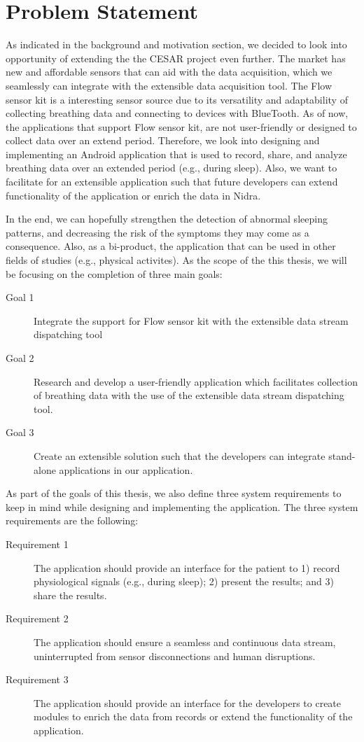 \section{Problem Statement}

As indicated in the background and motivation section, we decided to look into opportunity of extending the the CESAR project even further. The market has new and affordable sensors that can aid with the data acquisition, which we seamlessly can integrate with the extensible data acquisition tool. The Flow sensor kit is a interesting sensor source due to its versatility and adaptability of collecting breathing data and connecting to devices with BlueTooth. As of now, the applications that support Flow sensor kit, are not user-friendly or designed to collect data over an extend period. Therefore, we look into designing and implementing an Android application that is used to record, share, and analyze breathing data over an extended period (e.g., during sleep). Also, we want to facilitate for an extensible application such that future developers can extend functionality of the application or enrich the data in Nidra. 

In the end, we can hopefully strengthen the detection of abnormal sleeping patterns, and decreasing the risk of the symptoms they may come as a consequence. Also, as a bi-product, the application that can be used in other fields of studies (e.g., physical activites). As the scope of the this thesis, we will be focusing on the completion of three main goals:

\begin{description}
    \item[Goal 1] Integrate the support for Flow sensor kit with the extensible data stream dispatching tool
    \item[Goal 2] Research and develop a user-friendly application which facilitates collection of breathing data with the use of the extensible data stream dispatching tool.
    \item[Goal 3] Create an extensible solution such that the developers can integrate stand-alone applications in our application. 
\end{description}

As part of the goals of this thesis, we also define three system requirements to keep in mind while designing and implementing the application. The three system requirements are the following: 

\begin{description}
    \item[Requirement 1] The application should provide an interface for the patient to 1) record physiological signals (e.g., during sleep); 2) present the results; and 3) share the results.
    \item[Requirement 2] The application should ensure a seamless and continuous data stream, uninterrupted from sensor disconnections and human disruptions.
    \item[Requirement 3] The application should provide an interface for the developers to create modules to enrich the data from records or extend the functionality of the application.
\end{description}

